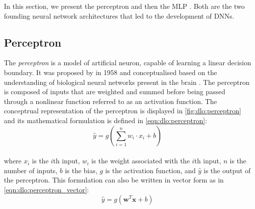 In this section, we present the perceptron \cite{rosenblatt1958perceptron} and
then the \acl{MLP} \cite{rosenblatt1961principles,rumelhart1986learning}. Both
are the two founding neural network architectures that led to the development of
\aclp{DNN}.

\subsection{Perceptron}\label{sec:dlo:perceptron}

The \emph{perceptron} is a model of artificial neuron, capable of learning a
linear decision boundary. It was proposed by
\citeauthor{rosenblatt1958perceptron} in 1958 \cite{rosenblatt1958perceptron}
and conceptualised based on the understanding of biological neural networks
present in the brain \cite{mcculloch1943logical,hebb2005organization}. The
perceptron is composed of inputs that are weighted and summed before being
passed through a nonlinear function referred to as an activation function. The
conceptrual representation of the perceptron is displayed in
\cref{fig:dlo:perceptron} and its mathematical formulation is defined in
\cref{eqn:dlo:perceptron}: \\

\begin{equation}
  \label{eqn:dlo:perceptron}
\hat{y} = g(\sum_{i=1}^{n} w_i \cdot x_i + b)
\end{equation} \\



\noindent where $x_i$ is the $i$th input, $w_i$ is the weight associated with
the $i$th input, $n$ is the number of inputs, $b$ is the bias, $g$ is the
activation function, and $\hat{y}$ is the output of the perceptron. This
formulation can also be written in vector form as in
\cref{eqn:dlo:perceptron_vector}: \\

\begin{equation}
  \label{eqn:dlo:perceptron_vector}
  \hat{y} = g(\mathbf{w}^T \mathbf{x} + b)
\end{equation}\\

